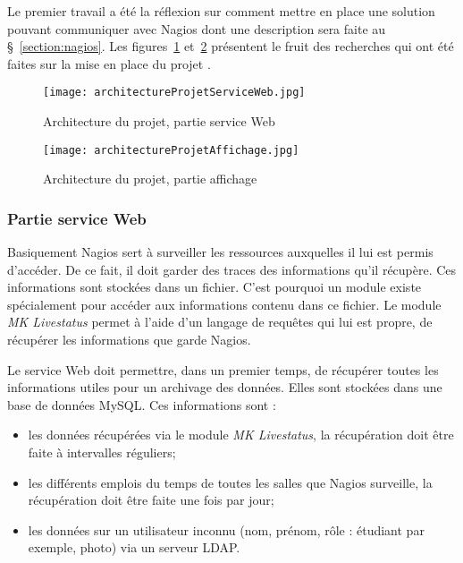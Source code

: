 Le premier travail a \'et\'e la r\'eflexion sur comment mettre en place une solution pouvant communiquer avec Nagios dont une description sera faite au \S~\ref{section:nagios}.
Les figures~\ref{figure:architectureProjetServiceWeb} et~\ref{figure:architectureProjetAffichage} pr\'esentent le fruit des recherches qui ont \'et\'e faites sur la mise en place du projet \YuukouII.

\begin{figure}[!ht]
	\centering
	\texttt{[image: architectureProjetServiceWeb.jpg]}
	\caption{Architecture du projet, partie service Web}
	\label{figure:architectureProjetServiceWeb}

\end{figure}

\begin{figure}[!ht]
	\centering
	\texttt{[image: architectureProjetAffichage.jpg]}
	\caption{Architecture du projet, partie affichage}
	\label{figure:architectureProjetAffichage}

\end{figure}

\subsubsection{Partie service Web}

Basiquement Nagios sert \`a surveiller les ressources auxquelles il lui est permis d'acc\'eder.
De ce fait, il doit garder des traces des informations qu'il r\'ecup\`ere.
Ces informations sont stock\'ees dans un fichier.
C'est pourquoi un module existe sp\'ecialement pour acc\'eder aux informations contenu dans ce fichier. 
Le module \textit{MK Livestatus} permet \`a l'aide d'un langage de requ\^etes qui lui est propre, de r\'ecup\'erer les informations que garde Nagios.

Le service Web doit permettre, dans un premier temps, de r\'ecup\'erer toutes les informations utiles pour un archivage des donn\'ees.
Elles sont stock\'ees dans une base de donn\'ees MySQL.
\noindent Ces informations sont :

\begin{itemize}
	\item les donn\'ees r\'ecup\'er\'ees via le module \textit{MK Livestatus}, la r\'ecup\'eration doit \^etre faite \`a intervalles r\'eguliers;
	\item les diff\'erents emplois du temps de toutes les salles que Nagios surveille, la r\'ecup\'eration doit \^etre faite une fois par jour;
	\item les donn\'ees sur un utilisateur inconnu (nom, pr\'enom, r\^ole : \'etudiant par exemple, photo) via un serveur LDAP.

\end{itemize}

